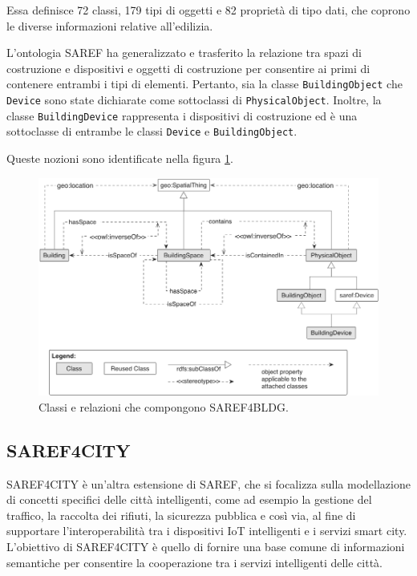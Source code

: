 Essa definisce 72 classi, 179 tipi di oggetti e 82 proprietà di tipo dati, che
coprono le diverse informazioni relative all'edilizia.

L'ontologia SAREF ha generalizzato e trasferito la relazione tra spazi di
costruzione e dispositivi e oggetti di costruzione per consentire ai primi di
contenere entrambi i tipi di elementi. Pertanto, sia la classe
\texttt{BuildingObject} che \texttt{Device} sono state dichiarate come
sottoclassi
di \texttt{PhysicalObject}. Inoltre, la classe \texttt{BuildingDevice}
rappresenta
i dispositivi di costruzione ed è una sottoclasse di entrambe le classi
\texttt{Device} e \texttt{BuildingObject}.

Queste nozioni sono identificate nella figura \ref{fig:saref4bldg}.
\begin{figure}[!ht]
      \centering
      \includegraphics[width=13cm]{figures/saref4bldg.png}
      \caption{Classi e relazioni che compongono SAREF4BLDG.}
      \label{fig:saref4bldg}
\end{figure}

\subsection{SAREF4CITY}
SAREF4CITY è un'altra estensione di SAREF, che si focalizza sulla modellazione
di concetti specifici delle città intelligenti, come ad esempio la gestione del
traffico, la raccolta dei rifiuti, la sicurezza pubblica e così via, al fine di
supportare l'interoperabilità tra i dispositivi IoT intelligenti e i servizi
smart city. L'obiettivo di SAREF4CITY è quello di fornire una base comune di
informazioni semantiche per consentire la cooperazione tra i servizi
intelligenti delle città.

